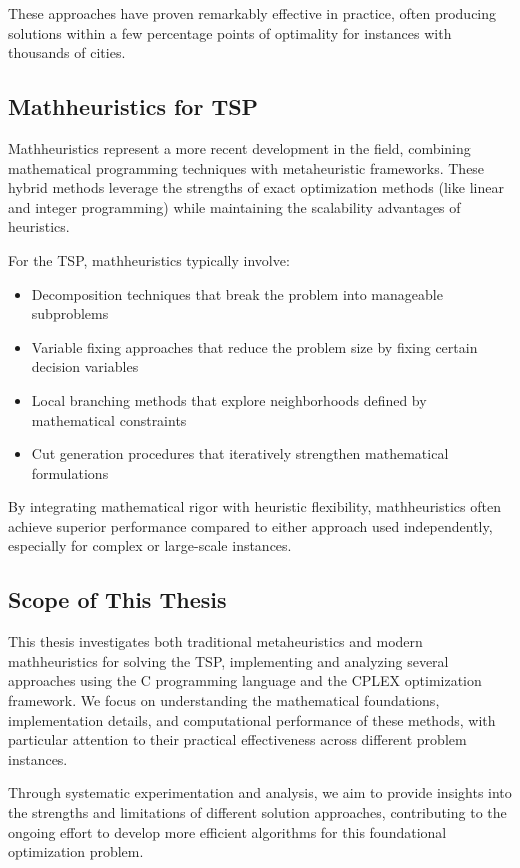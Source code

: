 \documentclass{article}
\begin{document}
These approaches have proven remarkably effective in practice, often producing solutions within a few percentage points of optimality for instances with thousands of cities.

\subsection{Mathheuristics for TSP}
Mathheuristics represent a more recent development in the field, combining mathematical programming techniques with metaheuristic frameworks. 
These hybrid methods leverage the strengths of exact optimization methods (like linear and integer programming) while maintaining the scalability advantages of heuristics.

For the TSP, mathheuristics typically involve:
\begin{itemize}
	\item Decomposition techniques that break the problem into manageable subproblems
	\item Variable fixing approaches that reduce the problem size by fixing certain decision variables
	\item Local branching methods that explore neighborhoods defined by mathematical constraints
	\item Cut generation procedures that iteratively strengthen mathematical formulations
\end{itemize}

By integrating mathematical rigor with heuristic flexibility, mathheuristics often achieve superior performance compared to either approach used independently, 
especially for complex or large-scale instances.

\subsection{Scope of This Thesis}
This thesis investigates both traditional metaheuristics and modern mathheuristics for solving the TSP, implementing and analyzing several 
approaches using the C programming language and the CPLEX optimization framework. We focus on understanding the mathematical foundations, implementation details, 
and computational performance of these methods, with particular attention to their practical effectiveness across different problem instances.

Through systematic experimentation and analysis, we aim to provide insights into the strengths and limitations of different solution approaches, contributing to the 
ongoing effort to develop more efficient algorithms for this foundational optimization problem.
\end{document}
